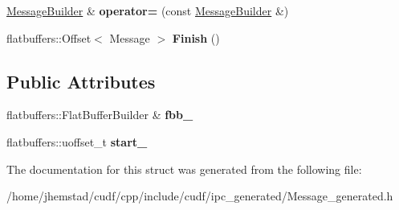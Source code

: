 \begin{DoxyCompactItemize}
\item 
\hyperlink{structorg_1_1apache_1_1arrow_1_1flatbuf_1_1MessageBuilder}{Message\+Builder} \& {\bfseries operator=} (const \hyperlink{structorg_1_1apache_1_1arrow_1_1flatbuf_1_1MessageBuilder}{Message\+Builder} \&)\hypertarget{structorg_1_1apache_1_1arrow_1_1flatbuf_1_1MessageBuilder_a242eae90e86a7857aca336711ea9d4f0}{}\label{structorg_1_1apache_1_1arrow_1_1flatbuf_1_1MessageBuilder_a242eae90e86a7857aca336711ea9d4f0}

\item 
flatbuffers\+::\+Offset$<$ Message $>$ {\bfseries Finish} ()\hypertarget{structorg_1_1apache_1_1arrow_1_1flatbuf_1_1MessageBuilder_aa86e5c3cb95bc7ec3358ac84f86de176}{}\label{structorg_1_1apache_1_1arrow_1_1flatbuf_1_1MessageBuilder_aa86e5c3cb95bc7ec3358ac84f86de176}

\end{DoxyCompactItemize}
\subsection*{Public Attributes}
\begin{DoxyCompactItemize}
\item 
flatbuffers\+::\+Flat\+Buffer\+Builder \& {\bfseries fbb\+\_\+}\hypertarget{structorg_1_1apache_1_1arrow_1_1flatbuf_1_1MessageBuilder_a2277e4b38d37e80c3837600d40a436f2}{}\label{structorg_1_1apache_1_1arrow_1_1flatbuf_1_1MessageBuilder_a2277e4b38d37e80c3837600d40a436f2}

\item 
flatbuffers\+::uoffset\+\_\+t {\bfseries start\+\_\+}\hypertarget{structorg_1_1apache_1_1arrow_1_1flatbuf_1_1MessageBuilder_ac3c697e588d78946632b7f9dd5b4ac88}{}\label{structorg_1_1apache_1_1arrow_1_1flatbuf_1_1MessageBuilder_ac3c697e588d78946632b7f9dd5b4ac88}

\end{DoxyCompactItemize}


The documentation for this struct was generated from the following file\+:\begin{DoxyCompactItemize}
\item 
/home/jhemstad/cudf/cpp/include/cudf/ipc\+\_\+generated/Message\+\_\+generated.\+h\end{DoxyCompactItemize}
